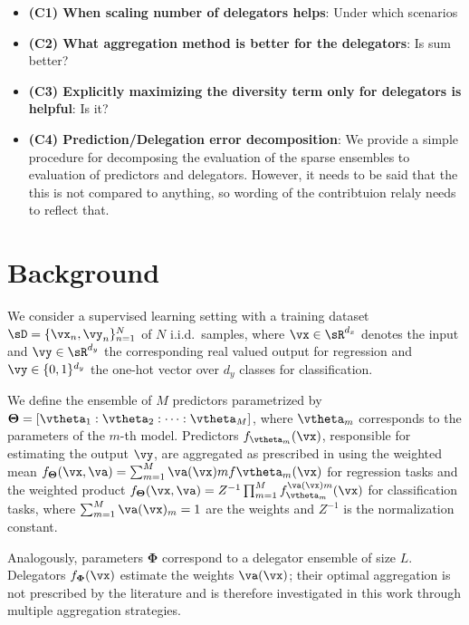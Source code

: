 \documentclass[10pt]{article} %
\def\vTheta{{\bm{\Theta}}}
\def\vPhi{{\bm{\Phi}}}
\begin{document}
\begin{itemize}
    \item \textbf{(C1) When scaling number of delegators helps}: Under which scenarios
    \item \textbf{(C2) What aggregation method is better for the delegators}: Is sum better?
     \item \textbf{(C3) Explicitly maximizing the diversity term only for delegators is helpful}: Is it?
    \item \textbf{(C4) Prediction/Delegation error decomposition}: We provide a simple procedure for decomposing the evaluation of the sparse ensembles to evaluation of predictors and delegators. However, it needs to be said that the this is not compared to anything, so wording of the contribtuion relaly needs to reflect that.
   
\end{itemize}

\section{Background} \label{sec:background}

We consider a supervised learning setting with a training dataset $\sD = \{\vx_n, \vy_n\}_{n=1}^{N}$ of $N$ i.i.d.\ samples, where $\vx \in \sR^{d_x}$ denotes the input and $\vy \in \sR^{d_y}$ the corresponding real valued output for regression and $\vy \in \{0, 1\}^{d_y}$ the one-hot vector over $d_y$ classes for classification.  


We define the ensemble of $M$ predictors parametrized by $\vTheta = [\vtheta_1 : \vtheta_2 : \dots : \vtheta_M]$, where $\vtheta_m$ corresponds to the parameters of the $m$-th model. Predictors $f_{\vtheta_m}(\vx)$, responsible for estimating the output $\vy$, are aggregated as prescribed in \cite{wood2023unified} using the weighted mean $f_{\vTheta}(\vx, \va) = \textstyle\sum_{m=1}^M \va(\vx)m f{\vtheta_m}(\vx)$ for regression tasks and the weighted product $f_{\vTheta}(\vx, \va) = Z^{-1} \textstyle\prod_{m=1}^M f_{\vtheta_m}^{\va(\vx)m}(\vx)$ for classification tasks, where $\textstyle\sum_{m=1}^{M} \va(\vx)_m = 1$ are the weights and $Z^{-1}$ is the normalization constant.

Analogously, parameters $\vPhi$ correspond to a delegator ensemble of size $L$. Delegators $f_{\vPhi}(\vx)$ estimate the weights $\va(\vx)$; their optimal aggregation is not prescribed by the literature and is therefore investigated in this work through multiple aggregation strategies.
\end{document}
